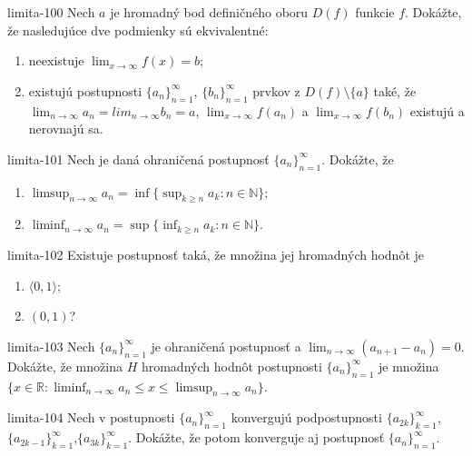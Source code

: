 \begin{defproblem}{limita-100}
Nech $a$ je hromadný bod definičného oboru $D(f)$ funkcie $f$. Dokážte, že nasledujúce dve podmienky sú ekvivalentné:
\begin{enumerate}
\item neexistuje $\lim_{x \rightarrow \infty} f(x)=b$;
\item existujú postupnosti ${\{a_n\}}_{n=1}^\infty$, ${\{b_n\}}_{n=1}^\infty$ prvkov z $D(f) \setminus \{a \}$ také, že $\lim_{n \rightarrow \infty} a_n=lim_{n \rightarrow \infty} b_n=a$, $\lim_{x \rightarrow \infty} f(a_n)$ a $\lim_{x \rightarrow \infty} f(b_n)$ existujú a nerovnajú sa.
\end{enumerate}
\end{defproblem}

\begin{defproblem}{limita-101}
Nech je daná ohraničená postupnosť ${\{a_n\}}_{n=1}^\infty$. Dokážte, že
\begin{multicols}{2}
\begin{enumerate}
    \item $\limsup_{n \rightarrow \infty} a_n=\inf \{\sup_{k \geq n} a_k: n \in \mathbb{N}\}$;
    \item $\liminf_{n \rightarrow \infty} a_n= \sup \{\inf_{k \geq n} a_k: n \in \mathbb{N}\}$.
\end{enumerate}
\end{multicols}
\end{defproblem}

\begin{defproblem}{limita-102}
Existuje postupnosť taká, že množina jej hromadných hodnôt je
\begin{enumerate}
\item $\langle 0,1 \rangle$;
\item $(0,1)$?
\end{enumerate}
\end{defproblem}

\begin{defproblem}{limita-103}
Nech ${\{a_n\}}_{n=1}^\infty$ je ohraničená postupnosť a $\lim_{n \rightarrow \infty} (a_{n+1}-a_n)=0$. Dokážte, že množina $H$ hromadných hodnôt postupnosti ${\{a_n\}}_{n=1}^\infty$ je množina $\{x \in \mathbb{R}: \liminf_{n \rightarrow \infty} a_n \leq x \leq \limsup_{n \rightarrow \infty} a_n\}$.
\end{defproblem}

\begin{defproblem}{limita-104}
Nech v postupnosti ${\{a_n\}}_{n=1}^\infty$ konvergujú podpostupnosti ${\{a_{2k}\}}_{k=1}^\infty$,${\{a_{2k-1}\}}_{k=1}^\infty$,${\{a_{3k}\}}_{k=1}^\infty$. Dokážte, že potom konverguje aj postupnosť ${\{a_n\}}_{n=1}^\infty$.
\end{defproblem}

